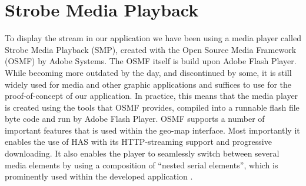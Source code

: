 \section{Strobe Media Playback}
\label{sec:smp}

To display the stream in our application we have been using a media player called Strobe Media Playback (SMP), created with the Open Source Media Framework (OSMF) by Adobe Systems. The OSMF itself is build upon Adobe Flash Player. While becoming more outdated by the day, and discontinued by some, it is still widely used for media and other graphic applications and suffices to use for the proof-of-concept of our application. In practice, this means that the media player is created using the tools that OSMF provides, compiled into a runnable flash file byte code and run by Adobe Flash Player. OSMF supports a number of important features that is used within the geo-map interface. Most importantly it enables the use of HAS with its HTTP-streaming support and progressive downloading. It also enables the player to seamlessly switch between several media elements by using a composition of “nested serial elements”, which is prominently used within the developed application \cite{osmf}.

